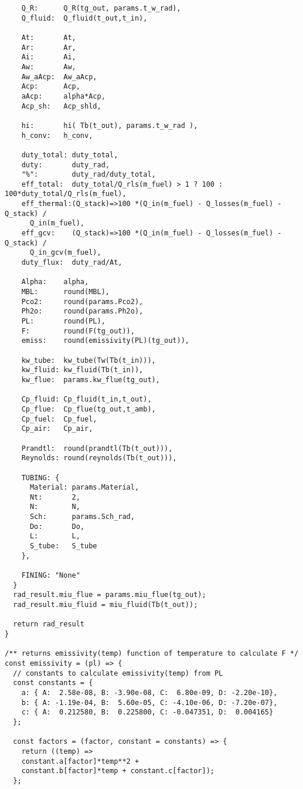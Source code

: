 \begin{verbatim}
    Q_R:      Q_R(tg_out, params.t_w_rad),
    Q_fluid:  Q_fluid(t_out,t_in),

    At:       At,
    Ar:       Ar,
    Ai:       Ai,
    Aw:       Aw,
    Aw_aAcp:  Aw_aAcp,
    Acp:      Acp,
    aAcp:     alpha*Acp,
    Acp_sh:   Acp_shld,

    hi:       hi( Tb(t_out), params.t_w_rad ),
    h_conv:   h_conv,

    duty_total: duty_total,
    duty:       duty_rad,
    "%":        duty_rad/duty_total,
    eff_total:  duty_total/Q_rls(m_fuel) > 1 ? 100 : 100*duty_total/Q_rls(m_fuel),
    eff_thermal:(Q_stack)=>100 *(Q_in(m_fuel) - Q_losses(m_fuel) - Q_stack) /
      Q_in(m_fuel),
    eff_gcv:    (Q_stack)=>100 *(Q_in(m_fuel) - Q_losses(m_fuel) - Q_stack) /
      Q_in_gcv(m_fuel),
    duty_flux:  duty_rad/At,

    Alpha:    alpha,
    MBL:      round(MBL),
    Pco2:     round(params.Pco2),
    Ph2o:     round(params.Ph2o),
    PL:       round(PL),
    F:        round(F(tg_out)),
    emiss:    round(emissivity(PL)(tg_out)),

    kw_tube:  kw_tube(Tw(Tb(t_in))),
    kw_fluid: kw_fluid(Tb(t_in)),
    kw_flue:  params.kw_flue(tg_out),

    Cp_fluid: Cp_fluid(t_in,t_out),
    Cp_flue:  Cp_flue(tg_out,t_amb),
    Cp_fuel:  Cp_fuel,
    Cp_air:   Cp_air,

    Prandtl:  round(prandtl(Tb(t_out))),
    Reynolds: round(reynolds(Tb(t_out))),

    TUBING: {
      Material: params.Material,
      Nt:       2,
      N:        N,
      Sch:      params.Sch_rad,
      Do:       Do,
      L:        L,
      S_tube:   S_tube
    },
    
    FINING: "None"
  }
  rad_result.miu_flue = params.miu_flue(tg_out);
  rad_result.miu_fluid = miu_fluid(Tb(t_out));
  
  return rad_result
}

/** returns emissivity(temp) function of temperature to calculate F */
const emissivity = (pl) => {
  // constants to calculate emissivity(temp) from PL
  const constants = {
    a: { A:  2.58e-08, B: -3.90e-08, C:  6.80e-09, D: -2.20e-10},
    b: { A: -1.19e-04, B:  5.60e-05, C: -4.10e-06, D: -7.20e-07},
    c: { A:  0.212580, B:  0.225800, C: -0.047351, D:  0.004165}
  };

  const factors = (factor, constant = constants) => {
    return ((temp) => 
    constant.a[factor]*temp**2 + 
    constant.b[factor]*temp + constant.c[factor]);
  };


\end{verbatim}
